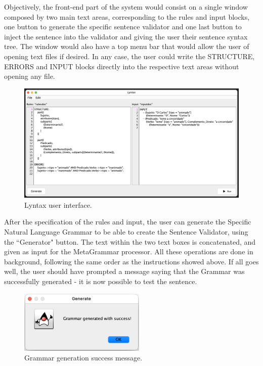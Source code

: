 Objectively, the front-end part of the system would consist on a single window composed by two main text areas, corresponding to the rules and input blocks,
one button to generate the specific sentence validator and one last button to inject the sentence into the validator and giving the user their sentence syntax tree.
The window would also have a top menu bar that would allow the user of opening text files if desired.
In any case, the user could write the STRUCTURE, ERRORS and INPUT blocks directly into the respective text areas without opening any file. 

\begin{figure}[h]
    \centering
    \includegraphics[width=14cm]{images/lyntax-gui.png}
    \caption{Lyntax user interface.}
    \label{fig:lyntaxGui}
\end{figure}

After the specification of the rules and input, the user can generate the Specific Natural Language Grammar to be able to create the Sentence Validator,
using the ``Generator" button.
The text within the two text boxes is concatenated, and given as input for the MetaGrammar processor.
All these operations are done in background, following the same order as the instructions showed above.
If all goes well, the user should have prompted a message saying that the Grammar was successfully generated - it is now possible to test the sentence.

\begin{figure}[h]
    \centering
    \includegraphics[width=6cm]{images/grammar_gen_success.png}
    \caption{Grammar generation success message.}
    \label{fig:grammarGenSuccess}
\end{figure}

